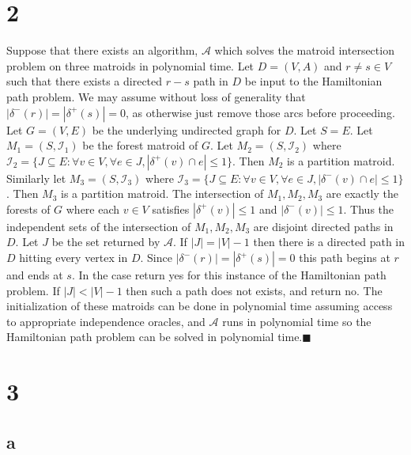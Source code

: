 \documentclass[letterpaper,12pt,oneside,onecolumn]{report}
\begin{document}
\section*{2}
Suppose that there exists an algorithm, $\mathcal{A}$ which solves the matroid intersection problem on three matroids in polynomial time. Let $D=(V,A)$ and $r \neq s \in V$ such that there exists a directed $r-s$ path in $D$ be input to the Hamiltonian path problem. We may assume without loss of generality that $|\delta^-(r)| = |\delta^+(s)| = 0$, as otherwise just remove those arcs before proceeding. Let $G=(V,E)$ be the underlying undirected graph for $D$. Let $S = E$. Let $M_1 = (S, \mathcal{I}_1)$ be the forest matroid of $G$. Let $M_2 = (S, \mathcal{I}_2)$ where $\mathcal{I}_2 = \{J \subseteq E : \forall v \in V, \forall e \in J, |\delta^+(v) \cap e| \leq 1 \}$. Then $M_2$ is a partition matroid. Similarly let $M_3 = (S, \mathcal{I}_3)$ where $\mathcal{I}_3 = \{J \subseteq E : \forall v \in V, \forall e \in J, |\delta^-(v) \cap e| \leq 1 \}$. Then $M_3$ is a partition matroid. The intersection of $M_1, M_2, M_3$ are exactly the forests of $G$ where each $v \in V$ satisfies $|\delta^+(v)| \leq 1$ and $|\delta^-(v)| \leq 1$. Thus the independent sets of the intersection of $M_1, M_2, M_3$ are disjoint directed paths in $D$.  Let $J$ be the set returned by $\mathcal{A}$. If $|J| = |V| - 1$ then there is a directed path in $D$ hitting every vertex in $D$. Since $|\delta^-(r)| = |\delta^+(s)| = 0$ this path begins at $r$ and ends at $s$. In the case return yes for this instance of the Hamiltonian path problem. If $|J| < |V| - 1$ then such a path does not exists, and return no. The initialization of these matroids can be done in polynomial time assuming access to appropriate independence oracles, and $\mathcal{A}$ runs in polynomial time so the Hamiltonian path problem can be solved in polynomial time.$\blacksquare$

\section*{3}
\subsection*{a}
\end{document}
